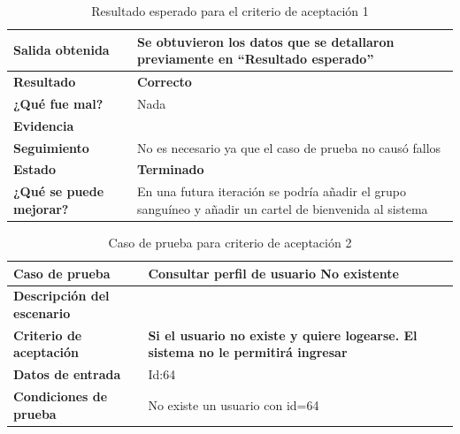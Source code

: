     {\scriptsize
	\begin{table}[h]
	\centering
	\begin{tabular}{|l|p{10cm}|}
	    \hline 
	    \textbf{Salida obtenida}&Se obtuvieron los datos que se detallaron previamente en ``Resultado esperado''\\ \hline
	    \textbf{Resultado}& \textbf{Correcto}\\ \hline
        \textbf{¿Qué fue mal?}& Nada\\ \hline      
        \textbf{Evidencia}&  \\ \hline
        \textbf{Seguimiento}& No es necesario ya que el caso de prueba no causó fallos \\ \hline
        \textbf{Estado}& \textbf{Terminado}\\ \hline        
        \textbf{¿Qué se puede mejorar?}& En una futura iteración se podría añadir el grupo sanguíneo y añadir un cartel de bienvenida al sistema \\ \hline              
	    \end{tabular}
        \caption{Resultado esperado para el criterio de aceptación 1}
    	\end{table}
	}
    

    
\clearpage    
    
    {\scriptsize
	\begin{table}[h]
	\centering
	\begin{tabular}{||l|p{10cm}||}
    	\rowcolor[gray]{0.9}
	    \hline 
        \hline 
	    \textbf{Caso de prueba} & \textbf{Consultar perfil de usuario No existente} \\  \hline
	    \textbf{Descripción del escenario}&\\ \hline
	    \textbf{Criterio de aceptación}&\textbf{Si el usuario no existe y quiere logearse. El sistema no le permitirá ingresar}\\ \hline
        \textbf{Datos de entrada}&  Id:64\\ \hline
        \textbf{Condiciones de  prueba}& No existe un usuario con id=64 \\ \hline \hline
	    \end{tabular}
        \caption{Caso de prueba para criterio de aceptación 2}
    	\end{table}
	}
    
